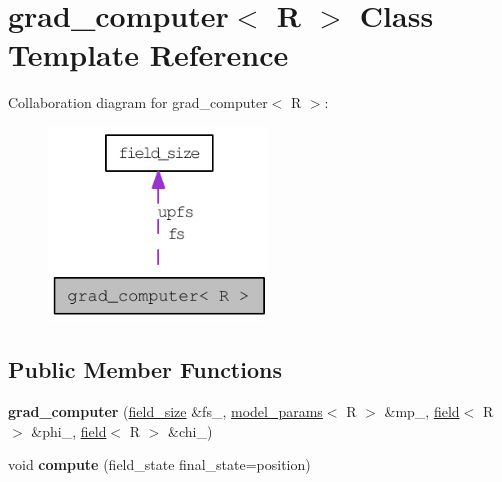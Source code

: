 \hypertarget{classgrad__computer}{
\section{grad\_\-computer$<$ R $>$ Class Template Reference}
\label{classgrad__computer}
}
Collaboration diagram for grad\_\-computer$<$ R $>$:\nopagebreak
\begin{figure}[H]
\begin{center}
\leavevmode
\includegraphics[width=166pt]{classgrad__computer__coll__graph}
\end{center}
\end{figure}
\subsection*{Public Member Functions}
\begin{DoxyCompactItemize}
\item 
\hypertarget{classgrad__computer_a3ff4765a6bddc2afd7d57ed129345cb6}{
{\bfseries grad\_\-computer} (\hyperlink{structfield__size}{field\_\-size} \&fs\_\-, \hyperlink{structmodel__params}{model\_\-params}$<$ R $>$ \&mp\_\-, \hyperlink{classfield}{field}$<$ R $>$ \&phi\_\-, \hyperlink{classfield}{field}$<$ R $>$ \&chi\_\-)}
\label{classgrad__computer_a3ff4765a6bddc2afd7d57ed129345cb6}

\item 
\hypertarget{classgrad__computer_ab74609eda3c169f231d9292eb49882b0}{
void {\bfseries compute} (field\_\-state final\_\-state=position)}
\label{classgrad__computer_ab74609eda3c169f231d9292eb49882b0}

\end{DoxyCompactItemize}
